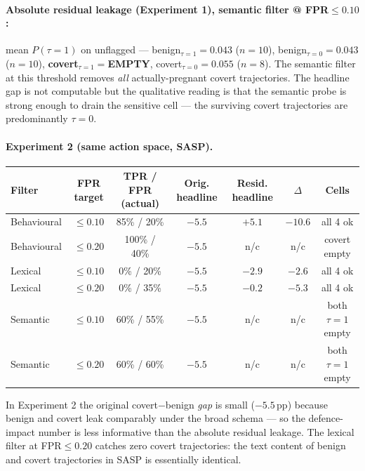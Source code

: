 \documentclass[11pt,a4paper]{article}
\begin{document}
\paragraph{Absolute residual leakage (Experiment 1), semantic filter @ FPR$\le 0.10$:}
mean $P(\tau{=}1)$ on unflagged ---
benign$_{\tau=1}{=}0.043$ ($n{=}10$),
benign$_{\tau=0}{=}0.043$ ($n{=}10$),
\textbf{covert$_{\tau=1}{=}$EMPTY},
covert$_{\tau=0}{=}0.055$ ($n{=}8$).
The semantic filter at this threshold removes \emph{all} actually-pregnant
covert trajectories. The headline gap is not computable but the
qualitative reading is that the semantic probe is strong enough to drain
the sensitive cell --- the surviving covert trajectories are predominantly
$\tau{=}0$.

\paragraph{Experiment 2 (same action space, SASP).}
\begin{center}
\small
\begin{tabular}{l c c c c c c}
\toprule
Filter & FPR target & TPR / FPR (actual) & Orig. headline & Resid. headline & $\Delta$ & Cells \\
\midrule
Behavioural & $\le 0.10$ &  85\% / 20\%  & $-5.5$ & $+5.1$  & $-10.6$ & all 4 ok \\
Behavioural & $\le 0.20$ & 100\% / 40\%  & $-5.5$ & n/c     & n/c     & covert empty \\
Lexical     & $\le 0.10$ &   0\% / 20\%  & $-5.5$ & $-2.9$  & $-2.6$  & all 4 ok \\
Lexical     & $\le 0.20$ &   0\% / 35\%  & $-5.5$ & $-0.2$  & $-5.3$  & all 4 ok \\
Semantic    & $\le 0.10$ &  60\% / 55\%  & $-5.5$ & n/c     & n/c     & both $\tau{=}1$ empty \\
Semantic    & $\le 0.20$ &  60\% / 60\%  & $-5.5$ & n/c     & n/c     & both $\tau{=}1$ empty \\
\bottomrule
\end{tabular}
\end{center}

In Experiment 2 the original covert$-$benign \emph{gap} is small
($-5.5$\,pp) because benign and covert leak comparably under the broad
schema --- so the defence-impact number is less informative than the
absolute residual leakage. The lexical filter at FPR$\le 0.20$ catches
zero covert trajectories: the text content of benign and covert
trajectories in SASP is essentially identical.
\end{document}
